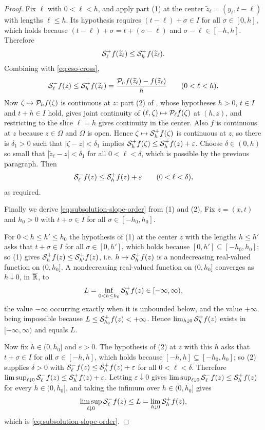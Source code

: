 \begin{proof}
Fix $\ell$ with $0<\ell<h$, and apply part (1) at the center
$\widetilde z_\ell=(y_\ell,t-\ell)$ with lengths $\ell\le h$. Its hypothesis
requires $(t-\ell)+\sigma\in I$ for all $\sigma\in[0,h]$, which holds because
$(t-\ell)+\sigma=t+(\sigma-\ell)$ and $\sigma-\ell\in[-h,h]$. Therefore
\[
  \mathcal{S}_\ell^+f(\widetilde z_\ell)\le\mathcal{S}_h^+f(\widetilde z_\ell).
\]
Combining with \eqref{eq:eso-cross},
\[
  \mathcal{S}_\ell^-f(z)\le\mathcal{S}_h^+f(\widetilde z_\ell)
   =\frac{\mathcal{P}_hf(\widetilde z_\ell)-f(\widetilde z_\ell)}{h}
   \qquad(0<\ell<h).
\]
Now $\zeta\mapsto\mathcal{P}_hf(\zeta)$ is continuous at $z$: part (2) of
, whose hypotheses $h>0$, $t\in I$ and $t+h\in I$ hold,
gives joint continuity of $(\ell,\zeta)\mapsto\mathcal{P}_\ell f(\zeta)$ at
$(h,z)$, and restricting to the slice $\ell=h$ gives continuity in the center.
Also
$f$ is continuous at $z$ because $z\in\Omega$ and $\Omega$ is open. Hence
$\zeta\mapsto\mathcal{S}_h^+f(\zeta)$ is continuous at $z$, so there is $\delta_1>0$
such that $|\zeta-z|<\delta_1$ implies
$\mathcal{S}_h^+f(\zeta)\le\mathcal{S}_h^+f(z)+\varepsilon$. Choose $\delta\in(0,h)$ so
small that $|\widetilde z_\ell-z|<\delta_1$ for all $0<\ell<\delta$, which is
possible by the previous paragraph. Then
\[
  \mathcal{S}_\ell^-f(z)\le\mathcal{S}_h^+f(z)+\varepsilon\qquad(0<\ell<\delta),
\]
as required.

Finally we derive \eqref{eq:subsolution-slope-order} from (1) and (2). Fix
$z=(x,t)$ and $h_0>0$ with $t+\sigma\in I$ for all $\sigma\in[-h_0,h_0]$.

For $0<h\le h'\le h_0$ the hypothesis of (1) at the center $z$ with the lengths
$h\le h'$ asks that $t+\sigma\in I$ for all $\sigma\in[0,h']$, which holds
because $[0,h']\subseteq[-h_0,h_0]$; so (1) gives
$\mathcal{S}_h^+f(z)\le\mathcal{S}_{h'}^+f(z)$, i.e. $h\mapsto\mathcal{S}_h^+f(z)$ is a
nondecreasing real-valued function on $(0,h_0]$. A nondecreasing real-valued
function on $(0,h_0]$ converges as $h\downarrow0$, in $\overline{\mathbb{R}}$, to
\[
  L=\inf_{0<h\le h_0}\mathcal{S}_h^+f(z)\in[-\infty,\infty),
\]
the value $-\infty$ occurring exactly when it is unbounded below, and the value
$+\infty$ being impossible because $L\le\mathcal{S}_{h_0}^+f(z)<+\infty$. Hence
$\lim_{h\downarrow0}\mathcal{S}_h^+f(z)$ exists in $[-\infty,\infty)$ and equals $L$.

Now fix $h\in(0,h_0]$ and $\varepsilon>0$. The hypothesis of (2) at $z$ with
this $h$ asks that $t+\sigma\in I$ for all $\sigma\in[-h,h]$, which holds
because $[-h,h]\subseteq[-h_0,h_0]$; so (2) supplies $\delta>0$ with
$\mathcal{S}_\ell^-f(z)\le\mathcal{S}_h^+f(z)+\varepsilon$ for all $0<\ell<\delta$.
Therefore $\limsup_{\ell\downarrow0}\mathcal{S}_\ell^-f(z)\le
\mathcal{S}_h^+f(z)+\varepsilon$. Letting $\varepsilon\downarrow0$ gives
$\limsup_{\ell\downarrow0}\mathcal{S}_\ell^-f(z)\le\mathcal{S}_h^+f(z)$ for every
$h\in(0,h_0]$, and taking the infimum over $h\in(0,h_0]$ gives
\[
  \limsup_{\ell\downarrow0}\mathcal{S}_\ell^-f(z)\le L
   =\lim_{h\downarrow0}\mathcal{S}_h^+f(z),
\]
which is \eqref{eq:subsolution-slope-order}.
\end{proof}
